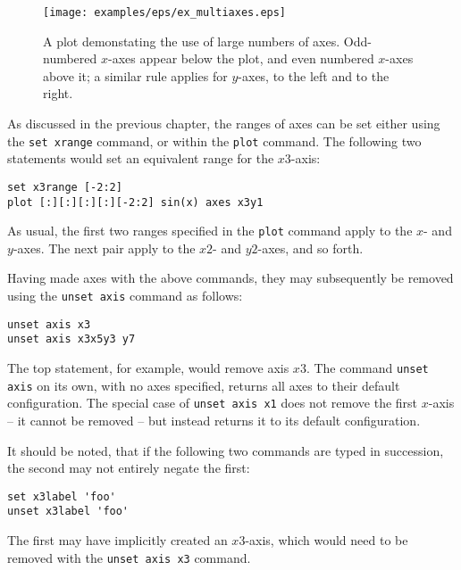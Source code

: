\documentclass[a4paper,onecolumn,11pt]{book}
\begin{document}
\begin{figure}
\begin{center}
\texttt{[image: examples/eps/ex\_multiaxes.eps]}
\end{center}
\caption{A plot demonstating the use of large numbers of axes. Odd-numbered
$x$-axes appear below the plot, and even numbered $x$-axes above it; a similar
rule applies for $y$-axes, to the left and to the right.}
\label{fig:ex_multiaxes}
\end{figure}

As discussed in the previous chapter, the ranges of axes can be set either
using the \texttt{set xrange} command, or within the \texttt{plot} command. The following two
statements would set an equivalent range for the $x3$-axis:

\begin{verbatim}
set x3range [-2:2]
plot [:][:][:][:][-2:2] sin(x) axes x3y1
\end{verbatim}

\noindent As usual, the first two ranges specified in the \texttt{plot} command
apply to the $x$- and $y$-axes. The next pair apply to the $x2$- and $y2$-axes,
and so forth.

\label{axis_removal} Having made axes with the above commands, they may
subsequently be removed using the \texttt{unset axis} command as follows:

\begin{verbatim}
unset axis x3
unset axis x3x5y3 y7
\end{verbatim}

\noindent The top statement, for example, would remove axis $x3$. The command
\texttt{unset axis} on its own, with no axes specified, returns all axes to
their default configuration.  The special case of \texttt{unset axis x1} does
not remove the first $x$-axis -- it cannot be removed -- but instead returns it
to its default configuration.

It should be noted, that if the following two commands are typed in succession,
the second may not entirely negate the first:

\begin{verbatim}
set x3label 'foo'
unset x3label 'foo'
\end{verbatim}

\noindent The first may have implicitly created an $x3$-axis, which would need
to be removed with the \texttt{unset axis x3} command.
\end{document}

